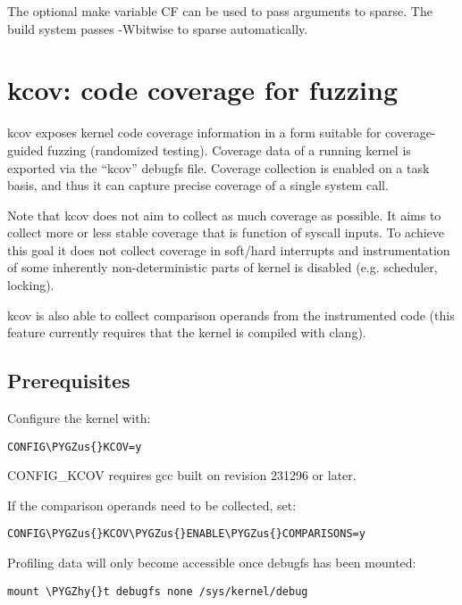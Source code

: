 \documentclass[a4paper,8pt,english]{sphinxmanual}
\def\PYGZus{\char`\_}
\def\PYGZhy{\char`\-}
\begin{document}
The optional make variable CF can be used to pass arguments to sparse.  The
build system passes -Wbitwise to sparse automatically.


\chapter{kcov: code coverage for fuzzing}
\label{dev-tools/kcov:kcov-code-coverage-for-fuzzing}\label{dev-tools/kcov::doc}
kcov exposes kernel code coverage information in a form suitable for coverage-
guided fuzzing (randomized testing). Coverage data of a running kernel is
exported via the ``kcov'' debugfs file. Coverage collection is enabled on a task
basis, and thus it can capture precise coverage of a single system call.

Note that kcov does not aim to collect as much coverage as possible. It aims
to collect more or less stable coverage that is function of syscall inputs.
To achieve this goal it does not collect coverage in soft/hard interrupts
and instrumentation of some inherently non-deterministic parts of kernel is
disabled (e.g. scheduler, locking).

kcov is also able to collect comparison operands from the instrumented code
(this feature currently requires that the kernel is compiled with clang).


\section{Prerequisites}
\label{dev-tools/kcov:prerequisites}
Configure the kernel with:

\begin{Verbatim}[commandchars=\\\{\}]
CONFIG\PYGZus{}KCOV=y
\end{Verbatim}

CONFIG\_KCOV requires gcc built on revision 231296 or later.

If the comparison operands need to be collected, set:

\begin{Verbatim}[commandchars=\\\{\}]
CONFIG\PYGZus{}KCOV\PYGZus{}ENABLE\PYGZus{}COMPARISONS=y
\end{Verbatim}

Profiling data will only become accessible once debugfs has been mounted:

\begin{Verbatim}[commandchars=\\\{\}]
mount \PYGZhy{}t debugfs none /sys/kernel/debug
\end{Verbatim}
\end{document}
